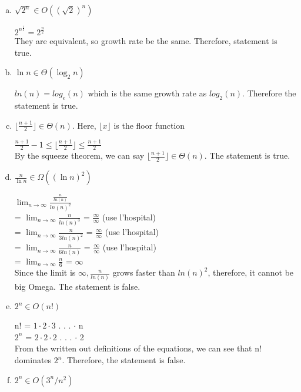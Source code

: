 \documentclass[11pt,letterpaper,unboxed,cm]{hmcpset}
\begin{document}
\begin{enumerate}
\begin{enumerate}[(a)]
\item  $\displaystyle \sqrt{2^n} \in O((\sqrt 2)^n)$

$2^{n^\frac{1}{2}} = 2^{\frac{n}{2}}$ \\
They are equivalent, so growth rate be the same. Therefore, statement is true.

\item  $ \displaystyle \ln n \in \Theta(\log_2 n)$

\bigskip
$ln(n) = log_{e}(n)$ which is the same growth rate as $log_{2}(n)$. Therefore the statement is true.
\bigskip

\item  $\displaystyle \lfloor \frac{n+1}{2}\rfloor \in \Theta(n)$. Here, $\lfloor x\rfloor$ is the floor function

\bigskip
$\frac{n+1}{2} - 1 \leq \lfloor \frac{n+1}{2}\rfloor \leq \frac{n+1}{2}$ \\
By the squeeze theorem, we can say $\lfloor \frac{n+1}{2}\rfloor \in \Theta(n)$. The statement is true.
\bigskip

\item $\displaystyle\frac{n}{\ln n} \in \Omega( (\ln n)^2)$

\bigskip
$\lim_{n\to\infty} \frac{\frac{n}{ln(n)}}{ln(n)^{2}}$ \\
= $\lim_{n\to\infty} \frac{n}{ln(n)^{3}}$ = $\frac{\infty}{\infty}$ (use l'hospital) \\
= $\lim_{n\to\infty} \frac{n}{3ln(n)^{2}}$ = $\frac{\infty}{\infty}$ (use l'hospital) \\
= $\lim_{n\to\infty} \frac{n}{6ln(n)}$ = $\frac{\infty}{\infty}$ (use l'hospital) \\
= $\lim_{n\to\infty} \frac{n}{6}$ = $\infty$ \\

Since the limit is $\infty, \frac{n}{ln(n)}$ grows faster than $ln(n)^{2}$, therefore, it cannot be big Omega. The statement is false.
\bigskip

\item $\displaystyle 2^n \in O(n!)$

\bigskip
n! = $1 \cdot 2 \cdot 3$ . . . $\cdot$ n \\
$2^n$ = $2 \cdot 2 \cdot 2$ . . . $\cdot$ 2 \\
From the written out definitions of the equations, we can see that n! dominates $2^n$. Therefore, the statement is false.
\bigskip

\item
$\displaystyle 2^n \in O(3^n/n^2)$


\end{enumerate}
\end{enumerate}
\end{document}

